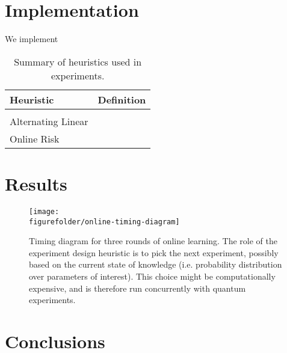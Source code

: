 \documentclass[aps,prl,twocolumn,superscriptaddress]{revtex4}
\newcommand{\figurefolder}{../fig}
\begin{document}
\section{Implementation}
\label{sec:implementation}

We implement 

\begin{table}
    \centering
    \begin{tabularx}{\textwidth}{lX}
        \textbf{Heuristic} & \textbf{Definition} \\
        \hline \\
        Alternating Linear &  \\
        Online Risk
    \end{tabularx}
    \caption{Summary of heuristics used in experiments.}
    \label{tab:heuristics}
\end{table}    

\section{Results}
\label{sec:results}

\begin{figure*}
    \texttt{[image: \\figurefolder/online-timing-diagram]}
    \caption{Timing diagram for three rounds of online learning. The role of the
    experiment design heuristic is to pick the next experiment, possibly based
    on the current state of knowledge (i.e. probability distribution over parameters
    of interest). This choice might be computationally expensive, and is 
    therefore run concurrently with quantum experiments.}
    \label{fig:online-timing-diagram}
\end{figure*}

\section{Conclusions}
\label{sec:conclusions}
\end{document}
